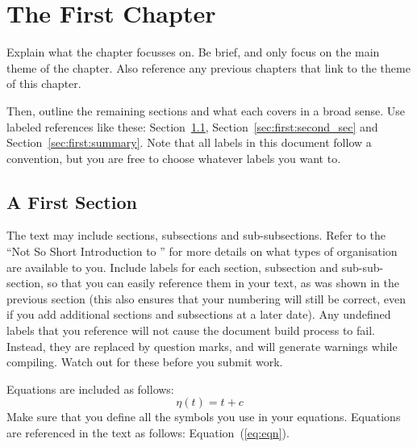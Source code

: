
\chapter{The First Chapter}
\label{chap:first}


Explain what the chapter focusses on. Be brief, and only focus on the main theme of the chapter. Also reference any previous chapters that link to the theme of this chapter.

Then, outline the remaining sections and what each covers in a broad sense. Use labeled references like these: Section~\ref{sec:first:first_sec}, Section~\ref{sec:first:second_sec} and Section~\ref{sec:first:summary}. Note that all labels in this document follow a convention, but you are free to choose whatever labels you want to.


\section{A First Section}
\label{sec:first:first_sec}

The text may include sections, subsections and sub-subsections. Refer to the ``Not So Short Introduction to \LaTeXe'' for more details on what types of organisation are available to you. Include labels for each section, subsection and sub-sub-section, so that you can easily reference them in your text, as was shown in the previous section (this also ensures that your numbering will still be correct, even if you add additional sections and subsections at a later date). Any undefined labels that you reference will not cause the document build process to fail. Instead, they are replaced by question marks, and will generate warnings while compiling. Watch out for these before you submit work.

Equations are included as follows:
\begin{equation}
\label{eq:eqn}
	\eta(t)=t+c
\end{equation}
Make sure that you define all the symbols you use in your equations. Equations are referenced in the text as follows: Equation~(\ref{eq:eqn}).

